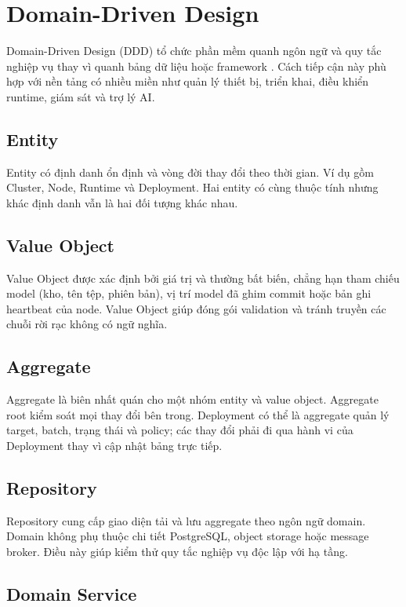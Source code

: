 \section{Domain-Driven Design}

Domain-Driven Design (DDD) tổ chức phần mềm quanh ngôn ngữ và quy tắc nghiệp
vụ thay vì quanh bảng dữ liệu hoặc framework \cite{evans2003ddd}. Cách tiếp cận
này phù hợp với nền tảng có nhiều miền như quản lý thiết bị, triển khai, điều
khiển runtime, giám sát và trợ lý AI.

\subsection{Entity}

Entity có định danh ổn định và vòng đời thay đổi theo thời gian. Ví dụ gồm
Cluster, Node, Runtime và Deployment. Hai entity có cùng thuộc tính nhưng
khác định danh vẫn là hai đối tượng khác nhau.

\subsection{Value Object}

Value Object được xác định bởi giá trị và thường bất biến, chẳng hạn tham chiếu
model (kho, tên tệp, phiên bản), vị trí model đã ghim commit hoặc bản ghi
heartbeat của node. Value Object
giúp đóng gói validation và tránh truyền các chuỗi rời rạc không có ngữ nghĩa.

\subsection{Aggregate}

Aggregate là biên nhất quán cho một nhóm entity và value object. Aggregate root
kiểm soát mọi thay đổi bên trong. Deployment có thể là aggregate quản lý target,
batch, trạng thái và policy; các thay đổi phải đi qua hành vi của Deployment thay
vì cập nhật bảng trực tiếp.

\subsection{Repository}

Repository cung cấp giao diện tải và lưu aggregate theo ngôn ngữ domain. Domain
không phụ thuộc chi tiết PostgreSQL, object storage hoặc message broker. Điều này
giúp kiểm thử quy tắc nghiệp vụ độc lập với hạ tầng.

\subsection{Domain Service}

